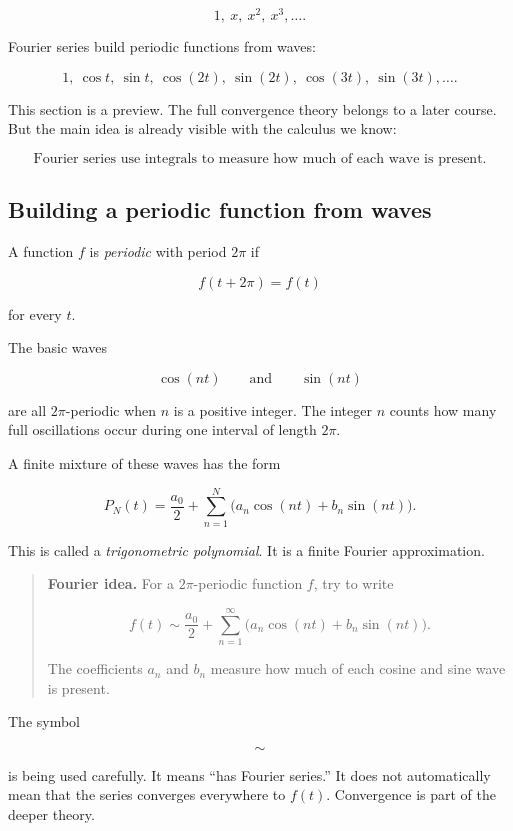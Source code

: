 \[
1,\ x,\ x^2,\ x^3,\ldots.
\]

Fourier series build periodic functions from waves:

\[
1,\ \cos t,\ \sin t,\ \cos(2t),\ \sin(2t),\ \cos(3t),\ \sin(3t),\ldots.
\]

This section is a preview.  The full convergence theory belongs to a later course.  But
the main idea is already visible with the calculus we know:

\[
\boxed{
\text{Fourier series use integrals to measure how much of each wave is present.}
}
\]

\subsection{Building a periodic function from waves}
\label{subsec:building-periodic-function-from-waves}

A function \(f\) is \emph{periodic} with period \(2\pi\) if

\[
f(t+2\pi)=f(t)
\]

for every \(t\).

The basic waves

\[
\cos(nt)
\qquad\text{and}\qquad
\sin(nt)
\]

are all \(2\pi\)-periodic when \(n\) is a positive integer.  The integer \(n\) counts how
many full oscillations occur during one interval of length \(2\pi\).

A finite mixture of these waves has the form

\[
P_N(t)
=
\frac{a_0}{2}
+
\sum_{n=1}^{N}
\bigl(a_n\cos(nt)+b_n\sin(nt)\bigr).
\]

This is called a \emph{trigonometric polynomial}.  It is a finite Fourier approximation.

\begin{quote}
\textbf{Fourier idea.}
For a \(2\pi\)-periodic function \(f\), try to write

\[
\boxed{
f(t)
\sim
\frac{a_0}{2}
+
\sum_{n=1}^{\infty}
\bigl(a_n\cos(nt)+b_n\sin(nt)\bigr).
}
\]

The coefficients \(a_n\) and \(b_n\) measure how much of each cosine and sine wave is
present.
\end{quote}

The symbol

\[
\sim
\]

is being used carefully.  It means ``has Fourier series.''  It does not automatically mean
that the series converges everywhere to \(f(t)\).  Convergence is part of the deeper
theory.

